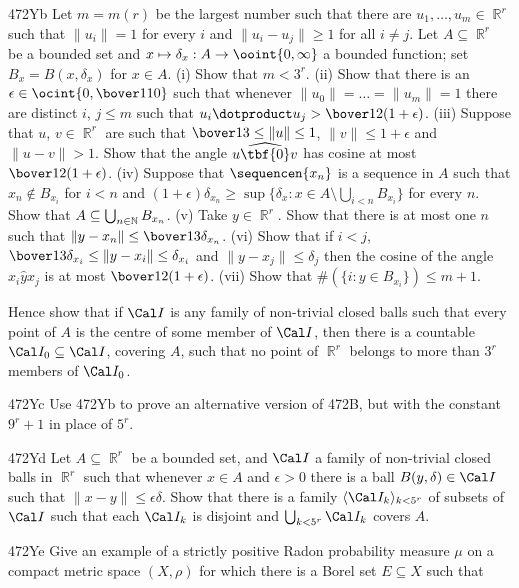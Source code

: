 {\spheader 472Yb Let $m=m(r)$ be the largest number such that there are
$u_1,\ldots,u_m\in\BbbR^r$ such that $\|u_i\|=1$ for every $i$ and
$\|u_i-u_j\|\ge 1$ for all $i\ne j$.   Let $A\subseteq\BbbR^r$ be a
bounded set and $x\mapsto\delta_x:A\to\ooint{0,\infty}$ a bounded
function;  set
$B_x=B(x,\delta_x)$ for $x\in A$.   (i) Show that $m<3^r$.
(ii) Show that there is an $\epsilon\in\ocint{0,\bover1{10}}$ such that
whenever $\|u_0\|=\ldots=\|u_m\|=1$ there are distinct $i$,
$j\le m$ such that $u_i\dotproduct u_j>\bover12(1+\epsilon)$.
(iii) Suppose that $u$, $v\in\BbbR^r$ are such that
$\bover13\le\|u\|\le 1$, $\|v\|\le 1+\epsilon$ and $\|u-v\|>1$.   Show
that the angle $u\widehat{\tbf{0}}v$ has cosine at most
$\bover12(1+\epsilon)$.      (iv)
Suppose that $\sequencen{x_n}$ is a
sequence in $A$ such that $x_n\notin B_{x_i}$ for $i<n$ and
$(1+\epsilon)\delta_{x_n}
\ge\sup\{\delta_x:x\in A\setminus\bigcup_{i<n}B_{x_i}\}$ for every $n$.
Show that $A\subseteq\bigcup_{n\in\Bbb N}B_{x_n}$.
(v) Take $y\in\BbbR^r$.   Show that there is at most one $n$ such that
$\|y-x_n\|\le\bover13\delta_{x_n}$.
(vi) Show that if $i<j$,
$\bover13\delta_{x_i}\le\|y-x_i\|\le\delta_{x_i}$ and
$\|y-x_j\|\le\delta_j$ then the cosine of the angle
$x_i\widehat{y}x_j$ is at most $\bover12(1+\epsilon)$.
(vii) Show that $\#(\{i:y\in B_{x_i}\})\le m+1$.

Hence show that if $\Cal I$ is any family of non-trivial closed balls
such that every point of $A$ is the centre of some member of $\Cal I$,
then there is a countable $\Cal I_0\subseteq\Cal I$, covering $A$, such
that no point of $\BbbR^r$ belongs to more than $3^r$ members of
$\Cal I_0$.

\spheader 472Yc Use 472Yb to prove an alternative version of 472B, but
with the constant $9^r+1$ in place of $5^r$.

\spheader 472Yd
Let $A\subseteq\BbbR^r$ be a bounded set, and $\Cal I$ a
family of non-trivial closed balls in $\BbbR^r$ such that whenever $x\in A$
and $\epsilon>0$ there is a ball $B(y,\delta)\in\Cal I$ such that
$\|x-y\|\le\epsilon\delta$.   Show that there is a family
$\langle\Cal I_k\rangle_{k<5^r}$ of
subsets of $\Cal I$ such that each $\Cal I_k$ is disjoint and
$\bigcup_{k<5^r}\Cal I_k$ covers $A$.

\spheader 472Ye Give an example of a strictly positive
Radon probability measure $\mu$ on a
compact metric space $(X,\rho)$ for which there is a Borel set
$E\subseteq X$ such that

}
